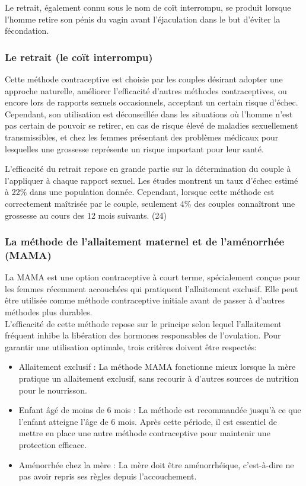 Le retrait, également connu sous le nom de coït interrompu, se produit lorsque l'homme retire son pénis du vagin avant l'éjaculation dans le but d'éviter la fécondation.


\subsubsection{Le retrait (le coït interrompu)}
Cette méthode contraceptive est choisie par les couples désirant adopter une approche naturelle, améliorer l'efficacité d'autres méthodes contraceptives, ou encore lors de rapports sexuels occasionnels, acceptant un certain risque d'échec. Cependant, son utilisation est déconseillée dans les situations où l'homme n'est pas certain de pouvoir se retirer, en cas de risque élevé de maladies sexuellement transmissibles, et chez les femmes présentant des problèmes médicaux pour lesquelles une grossesse représente un risque important pour leur santé.\vspace*{1em}

\noindent L'efficacité du retrait repose en grande partie sur la détermination du couple à l'appliquer à chaque rapport sexuel. Les études montrent un taux d'échec estimé à 22\% dans une population donnée. Cependant, lorsque cette méthode est correctement maîtrisée par le couple, seulement 4\% des couples connaîtront une grossesse au cours des 12 mois suivants. (24)

\subsubsection{La méthode de l’allaitement maternel et de l’aménorrhée (MAMA)}
La MAMA est une option contraceptive à court terme, spécialement conçue pour les femmes récemment accouchées qui pratiquent l'allaitement exclusif. Elle peut être utilisée comme méthode contraceptive initiale avant de passer à d'autres méthodes plus durables.\\

\noindent L'efficacité de cette méthode repose sur le principe selon lequel l'allaitement fréquent inhibe la libération des hormones responsables de l'ovulation. Pour garantir une utilisation optimale, trois critères doivent être respectés:\vspace*{1em}

\begin{itemize}[label={$\bullet$}, align=right]
  \item Allaitement exclusif : La méthode MAMA fonctionne mieux lorsque la mère pratique un allaitement exclusif, sans recourir à d'autres sources de nutrition pour le nourrisson.

  \item Enfant âgé de moins de 6 mois : La méthode est recommandée jusqu'à ce que l'enfant atteigne l'âge de 6 mois. Après cette période, il est essentiel de mettre en place une autre méthode contraceptive pour maintenir une protection efficace.
  
  \item Aménorrhée chez la mère : La mère doit être aménorrhéique, c'est-à-dire ne pas avoir repris ses règles depuis l'accouchement.
  
\end{itemize}

